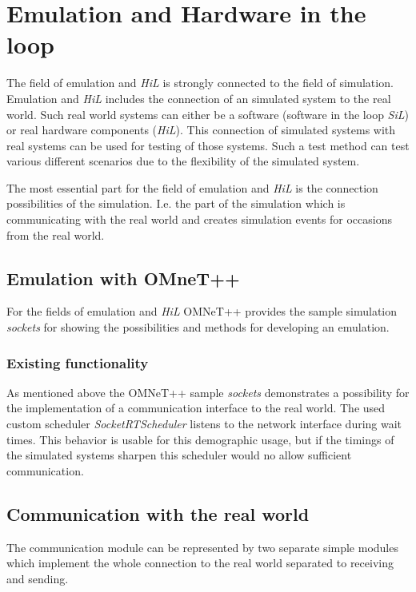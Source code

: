 \chapter{Emulation and Hardware in the loop}
\label{cha:emulation}

The field of emulation and \emph{HiL} is strongly connected to the field of simulation.
Emulation and \emph{HiL} includes the connection of an simulated system to the real world.
Such real world systems can either be a software (software in the loop \emph{SiL}) or real hardware components (\emph{HiL}).
This connection of simulated systems with real systems can be used for testing of those systems.
Such a test method can test various different scenarios due to the flexibility of the simulated system.

The most essential part for the field of emulation and \emph{HiL} is the connection possibilities of the simulation.
I.e. the part of the simulation which is communicating with the real world and creates simulation events for occasions from the real world.


\section{Emulation with OMneT++}
\label{sec:emulation_omnet}
For the fields of emulation and \emph{HiL} OMNeT++ provides the sample simulation \emph{sockets} for showing the possibilities and methods for developing an emulation.

\subsection{Existing functionality}
\label{sec:emulation_omnet_existing}
As mentioned above the OMNeT++ sample \emph{sockets} demonstrates a possibility for the implementation of a communication interface to the real world.
The used custom scheduler \emph{SocketRTScheduler} listens to the network interface during wait times.
This behavior is usable for this demographic usage, but if the timings of the simulated systems sharpen this scheduler would no allow sufficient communication.


\section{Communication with the real world}
The communication module can be represented by two separate simple modules which implement the whole connection to the real world separated to receiving and sending.

